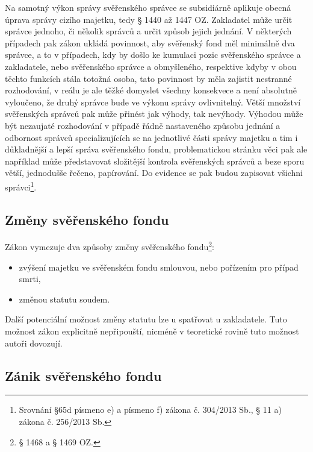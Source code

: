 \documentclass{article}
\begin{document}
Na samotný výkon správy svěřenského správce se subsidiárně aplikuje obecná úprava správy cizího majetku, tedy § 1440 až 1447 OZ. Zakladatel může určit správce jednoho, či několik správců a určit způsob jejich jednání. V některých případech pak zákon ukládá povinnost, aby svěřenský fond měl minimálně dva správce, a to v případech, kdy by došlo ke kumulaci pozic svěřenského správce a zakladatele, nebo svěřenského správce a obmyšleného, respektive kdyby v obou těchto funkcích stála totožná osoba, tato povinnost by měla zajistit nestranné rozhodování, v reálu je ale těžké domyslet všechny konsekvece a není absolutně vyloučeno, že druhý správce bude ve výkonu správy ovlivnitelný. Větší množství svěřenských správců pak může přinést jak výhody, tak nevýhody. Výhodou může být nezaujaté rozhodování v případě řádně nastaveného způsobu jednání a odbornost správců specializujících se na jednotlivé části správy majetku a tim i důkladnější a lepší správa svěřenského fondu, problematickou stránku věci pak ale například může představovat složitější kontrola svěřenských správců a beze sporu větší, jednodušše řečeno, papírování. Do evidence se pak budou zapisovat všichni správci\footnote{Srovnání §65d písmeno e) a písmeno f) zákona č. 304/2013 Sb., § 11 a) zákona č. 256/2013 Sb.}.\\

\subsection{Změny svěřenského fondu}

Zákon vymezuje dva způsoby změny svěřenského fondu\footnote{§ 1468 a § 1469 OZ.}:\\

\begin{itemize}
\item zvýšení majetku ve svěřenském fondu smlouvou, nebo pořízením pro případ smrti,
\item změnou statutu soudem.	
\end{itemize}

Další potenciální možnost změny statutu lze u spatřovat u zakladatele. Tuto možnost zákon explicitně nepřipouští, nicméně v teoretické rovině tuto možnost autoři dovozují.

\subsection{Zánik svěřenského fondu}
\end{document}
